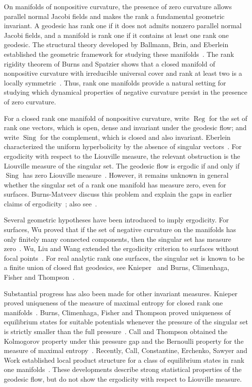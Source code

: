 \documentclass[reqno,11pt]{article}
\theoremstyle{definition}
\theoremstyle{remark}
\numberwithin{equation}{section}
\DeclareMathOperator{\sing}{Sing}
\DeclareMathOperator{\reg}{Reg}
\begin{document}
On manifolds of nonpositive curvature, the presence of zero curvature allows parallel normal Jacobi fields and makes the rank a fundamental geometric invariant. A geodesic has rank one if it does not admits nonzero parallel normal Jacobi fields, and a manifold is rank one if it contains at least one rank one geodesic. The structural theory developed by Ballmann, Brin, and Eberlein established the geometric framework for studying these manifolds~\cite{BallmannBrinEberlein1985}. The rank rigidity theorem of Burns and Spatzier shows that a closed manifold of nonpositive curvature with irreducible universal cover and rank at least two is a locally symmetric~\cite{BurnsSpatzier1987}. Thus, rank one manifolds provide a natural setting for studying which dynamical properties of negative curvature persist in the presence of zero curvature.

For a closed rank one manifold of nonpositive curvature, write $\reg$ for the set of rank one vectors, which is open, dense and invariant under the geodesic flow; and write $\sing$ for the complement, which is closed and also invariant. Eberlein characterized the uniform hyperbolicity by the absence of singular vectors~\cite{Eberlein1973}. For ergodicity with respect to the Liouville measure, the relevant obstruction is the Liouville measure of the singular set. The geodesic flow is ergodic if and only if $\sing$ has zero Liouville measure~\cite{Burns1983, BurnsMatveev2021}. However, it remains unknown in general whether the singular set of a rank one manifold has measure zero, even for surfaces. Burns-Matveev discuss this problem and explain the gaps in earlier claims of ergodicity~\cite[Section~6.1]{BurnsMatveev2021}; also see~\cite{Wu2015}.

Several geometric hypotheses have been introduced to imply ergodicity. For surfaces, Wu proved that if the set of negative curvature on the manifolds has only finitely many connected components, then the singular set has measure zero~\cite{Wu2015}. Wu, Liu and Wang extended the ergodicity criterion to surfaces without focal points~\cite{WuLiuWang2023}. For real analytic rank one surfaces, the singular set is known to be a finite union of closed flat geodesics, see Knieper~\cite[Section~14]{Hasselblatt2007} and Burns, Climenhaga, Fisher and Thompson~\cite[Section~10.1]{BurnsClimenhagaFisherThompson2018}.

Substantial progress has also been made for other invariant measures. Knieper proved uniqueness of the measure of maximal entropy for closed rank one manifolds~\cite{Knieper1998}. Burns, Climenhaga, Fisher and Thompson proved uniqueness of equilibrium states for suitable potentials whenever the pressure of the singular set is strictly smaller than the full pressure~\cite{BurnsClimenhagaFisherThompson2018}. Call and Thompson obtained the Kolmogorov property under this pressure gap and the Bernoulli property for the measure of maximal entropy~\cite{CallThompson2022}. Recently, Call, Constantine, Erchenko, Sawyer and Work established local product structure for a class of equilibrium states in rank one manifolds~\cite{CallConstantineErchenkoSawyerWork2026}. These developments describe strong statistical properties of the geodesic flow, but do not show the ergodicity with respect to Liouville measure.
\end{document}
